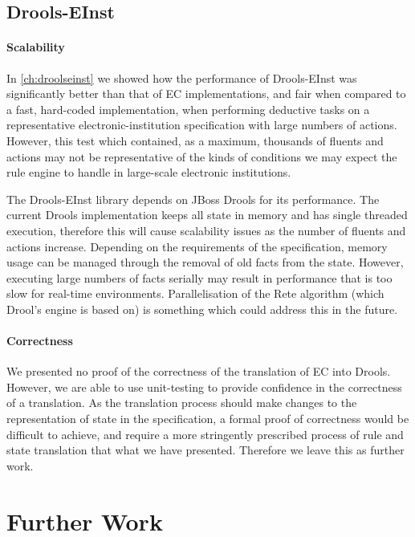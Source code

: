 \subsection{Drools-EInst}

\paragraph{Scalability}

In \autoref{ch:droolseinst} we showed how the performance of Drools-EInst was
significantly better than that of \ac{EC} implementations, and fair when
compared to a fast, hard-coded implementation, when performing deductive tasks
on a representative electronic-institution specification with large numbers of
actions. However, this test which contained, as a maximum, thousands of
fluents and actions may not be representative of the kinds of conditions we
may expect the rule engine to handle in large-scale electronic institutions.

The Drools-EInst library depends on JBoss Drools for its performance. The
current Drools implementation keeps all state in memory and has single
threaded execution, therefore this will cause scalability issues as the number
of fluents and actions increase. Depending on the requirements of the
specification, memory usage can be managed through the removal of old facts
from the state. However, executing large numbers of facts serially may result
in performance that is too slow for real-time environments. Parallelisation of
the Rete algorithm (which Drool's engine is based on) is something which could
address this in the future.

\paragraph{Correctness} We presented no proof of the correctness of the
translation of \ac{EC} into Drools. However, we are able to use unit-testing
to provide confidence in the correctness of a translation. As the translation
process should make changes to the representation of state in the
specification, a formal proof of correctness would be difficult to achieve,
and require a more stringently prescribed process of rule and state
translation that what we have presented. Therefore we leave this as further
work.

\section{Further Work}

